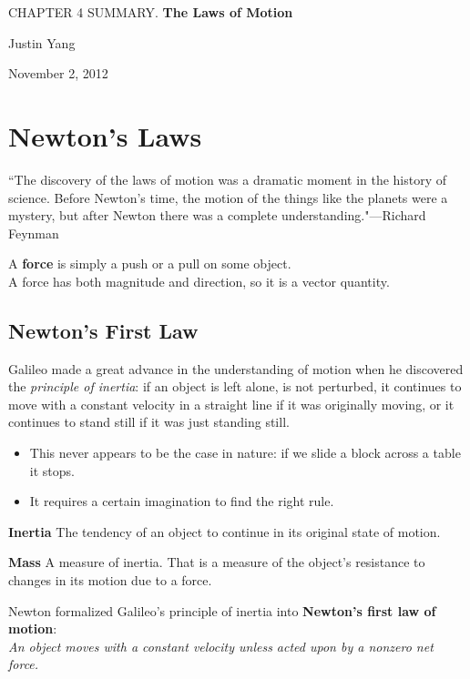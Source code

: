 \documentclass[11pt,a4paper]{report}
\begin{document}
\setcounter{secnumdepth}{0}
\begin{center}
\Large{CHAPTER 4 SUMMARY. \textbf{The Laws of Motion}}

\large{Justin Yang}

November 2, 2012
\end{center}

\section{Newton's Laws}
``The discovery of the laws of motion was a dramatic moment in the history of science. Before Newton's time, the motion of the things like the planets were a mystery, but after Newton there was a complete understanding."---Richard Feynman

\hspace{1mm}

\noindent
A \textbf{force} is simply a push or a pull on some object.\\A force has both magnitude and direction, so it is a vector quantity.

\subsection{Newton's First Law}
Galileo made a great advance in the understanding of motion when he discovered the \textit{principle of inertia}: if an object is left alone, is not perturbed, it continues to move with a constant velocity in a straight line if it was originally moving, or it continues to stand still if it was just standing still.
\begin{itemize}
	\item This never appears to be the case in nature: if we slide a block across a table it stops.
	\item It requires a certain imagination to find the right rule.
\end{itemize}
\textbf{Inertia} The tendency of an object to continue in its original state of motion.

\hspace{1mm}

\noindent
\textbf{Mass} A measure of inertia. That is a measure of the object's resistance to changes in its motion due to a force.

\hspace{1mm}

\noindent
Newton formalized Galileo's principle of inertia into \textbf{Newton's first law of motion}:\\\emph{An object moves with a constant velocity unless acted upon by a nonzero net force.}
\end{document}

